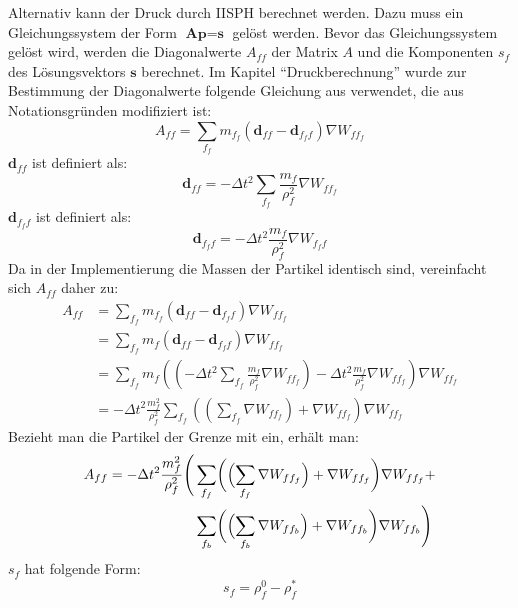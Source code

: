 \documentclass[11pt,
a4paper,
parskip=half, %
BCOR=10mm, %
english,
ngerman]{scrreprt}
\begin{document}
Alternativ kann der Druck durch IISPH \cite{ihmsen_implicit_2014} berechnet werden.
Dazu muss ein Gleichungssystem der Form $\textbf{A} \textbf{p} = \textbf{s}$ gelöst werden.
Bevor das Gleichungssystem gelöst wird, werden die Diagonalwerte $A_{ff}$ der Matrix $A$ und die Komponenten $s_f$ des Lösungsvektors $\textbf{s}$ berechnet.
Im Kapitel "`Druckberechnung"' wurde zur Bestimmung der Diagonalwerte folgende Gleichung aus \cite{ihmsen_implicit_2014} verwendet,
die aus Notationsgründen modifiziert ist:
\begin{equation}
    A_{ff} = \sum_{f_f} m_{f_f} \left(\textbf{d}_{ff} - \textbf{d}_{f_f f}\right)  \nabla W_{ff_f}
\end{equation}
$\textbf{d}_{ff}$ ist definiert als:
\begin{equation}
    \textbf{d}_{ff} = -\Delta t^2 \sum_{f_f} \frac{m_f}{\rho_f^2} \nabla W_{ff_f}
\end{equation}
$\textbf{d}_{f_f f}$ ist definiert als:
\begin{equation}
    \textbf{d}_{f_f f} = -\Delta t^2 \frac{m_f}{\rho_f^2} \nabla W_{f_f f}
\end{equation}
Da in der Implementierung die Massen der Partikel identisch sind, vereinfacht sich $A_{ff}$ daher zu:
\begin{align}
    A_{ff} &= \sum_{f_f} m_{f_f} \left(\textbf{d}_{ff} - \textbf{d}_{f_f f}\right)  \nabla W_{ff_f}\\
        &= \sum_{f_f} m_f \left(\textbf{d}_{ff} - \textbf{d}_{f_f f}\right)  \nabla W_{ff_f}\\
        &= \sum_{f_f} m_f 
        \left(\left(-\Delta t^2 \sum_{f_f} \frac{m_f}{\rho_f^2} \nabla W_{ff_f}\right) - \Delta t^2 \frac{m_f}{\rho_f^2} \nabla W_{ff_f}\right) 
        \nabla W_{ff_f}\\
        &= - \Delta t^2 \frac{m_f^2}{\rho_f^2} \sum_{f_f} \left(\left(\sum_{f_f} \nabla W_{ff_f}\right) + \nabla W_{ff_f}\right) \nabla W_{ff_f}
\end{align}
Bezieht man die Partikel der Grenze mit ein, erhält man:
\begin{align}
    A_{ff} = - \Delta t^2 \frac{m_f^2}{\rho_f^2} \Biggl(&\sum_{f_f} \biggl(\Bigl(\sum_{f_f} \nabla W_{ff_f}\Bigr) + \nabla W_{ff_f}\biggr) \nabla W_{ff_f}+\\
        &\sum_{f_b} \biggl(\Bigl(\sum_{f_b} \nabla W_{ff_b}\Bigr) + \nabla W_{ff_b}\biggr) \nabla W_{ff_b}\Biggr)
\end{align}
$s_f$ hat folgende Form:
\begin{equation}
    s_f = \rho_f^0 - \rho_f^*
\end{equation}
\end{document}
